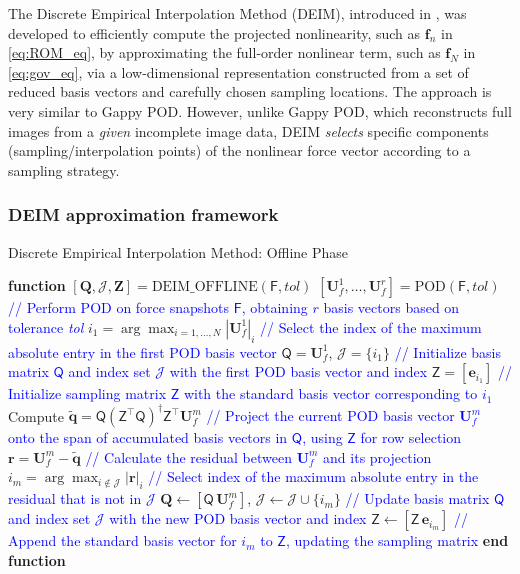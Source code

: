 \documentclass[11pt]{article}
\renewcommand{\vec}[1]{\mathbf{#1}}
\newcommand{\mat}[1]{\mathsf{#1}}
\begin{document}
The Discrete Empirical Interpolation Method (DEIM), introduced in \cite{chaturantabut2010nonlinear}, was developed to efficiently compute the projected nonlinearity, such as $\vec{f}_n$ in \cref{eq:ROM_eq}, by approximating the full-order nonlinear term, such as $\vec{f}_N$ in \cref{eq:gov_eq}, via a low-dimensional representation constructed from a set of reduced basis vectors and carefully chosen sampling locations.
The approach is very similar to Gappy POD.
However, unlike Gappy POD, which reconstructs full images from a \textit{given} incomplete image data, DEIM \textit{selects} specific components (sampling/interpolation points) of the nonlinear force vector according to a sampling strategy.

\subsubsection*{DEIM approximation framework}
\begin{algorithm}[t]
\caption{Discrete Empirical Interpolation Method: Offline Phase \cite{Hesthaven2016,chaturantabut2010nonlinear}}
\begin{algorithmic}[1]
\STATE \textbf{function} $[\mathbf{Q}, \mathcal{J}, \mathbf{Z}] = \text{DEIM\_OFFLINE}(\mat{F}, tol)$
\STATE $[\vec{U}_f^1, \dots, \vec{U}_f^r] = \text{POD}(\mat{F}, tol)$ \textcolor{blue}{// Perform POD on force snapshots $\mat{F}$, obtaining $r$ basis vectors based on tolerance \textit{tol}}
\STATE $i_1 = \arg\max_{i=1,\dots,N} |\vec{U}_f^1|_i$ \textcolor{blue}{// Select the index of the maximum absolute entry in the first POD basis vector}
\STATE $\mat{Q} = \vec{U}_f^1$, $\mathcal{J} = \{ i_1 \}$ \textcolor{blue}{// Initialize basis matrix $\mat{Q}$ and index set $\mathcal{J}$ with the first POD basis vector and index}
\STATE $\mat{Z} = [\vec{e}_{i_1}]$ \textcolor{blue}{// Initialize sampling matrix $\mat{Z}$ with the standard basis vector corresponding to $i_1$}
    \STATE Compute $\mathbf{\tilde{q}} = \mat{Q} (\mat{Z}^\top \mat{Q})^{\dagger} \mat{Z}^\top \vec{U}_f^m$ \textcolor{blue}{// Project the current POD basis vector $\vec{U}_f^m$ onto the span of accumulated basis vectors in $\mat{Q}$, using $\mat{Z}$ for row selection}
    \STATE $\mathbf{r} = \vec{U}_f^m - \mathbf{\tilde{q}}$ \textcolor{blue}{// Calculate the residual between $\vec{U}_f^m$ and its projection}
    \STATE $i_m = \arg\max_{i \notin \mathcal{J}} |\mathbf{r}|_i$ \textcolor{blue}{// Select index of the maximum absolute entry in the residual that is not in $\mathcal{J}$}
    \STATE $\mathbf{Q} \leftarrow [\mat{Q} \, \vec{U}_f^m]$, $\mathcal{J} \leftarrow \mathcal{J} \cup \{ i_m \}$ \textcolor{blue}{// Update basis matrix $\mat{Q}$ and index set $\mathcal{J}$ with the new POD basis vector and index}
    \STATE $\mat{Z} \leftarrow [\mat{Z} \, \vec{e}_{i_m}]$ \textcolor{blue}{// Append the standard basis vector for $i_m$ to $\mat{Z}$, updating the sampling matrix}
\ENDFOR
\STATE \textbf{end function}
\end{algorithmic}
\label{alg:DEIM_offline}
\end{algorithm}
\end{document}
